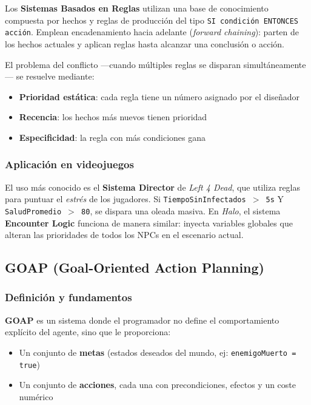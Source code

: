 \documentclass[12pt,letterpaper]{article}
\begin{document}
Los \textbf{Sistemas Basados en Reglas} utilizan una base de conocimiento compuesta por hechos y reglas de producción del tipo \texttt{SI condición ENTONCES acción}. Emplean encadenamiento hacia adelante (\textit{forward chaining}): parten de los hechos actuales y aplican reglas hasta alcanzar una conclusión o acción.

El problema del conflicto —cuando múltiples reglas se disparan simultáneamente— se resuelve mediante:

\begin{itemize}[nosep]
  \item \textbf{Prioridad estática}: cada regla tiene un número asignado por el diseñador
  \item \textbf{Recencia}: los hechos más nuevos tienen prioridad
  \item \textbf{Especificidad}: la regla con más condiciones gana
\end{itemize}

\subsubsection{Aplicación en videojuegos}

El uso más conocido es el \textbf{Sistema Director} de \textit{Left 4 Dead}, que utiliza reglas para puntuar el \textit{estrés} de los jugadores. Si \texttt{TiempoSinInfectados $>$ 5s} Y \texttt{SaludPromedio $>$ 80}, se dispara una oleada masiva. En \textit{Halo}, el sistema \textbf{Encounter Logic} funciona de manera similar: inyecta variables globales que alteran las prioridades de todos los NPCs en el escenario actual.

\subsection{GOAP (Goal-Oriented Action Planning)}

\subsubsection{Definición y fundamentos}

\textbf{GOAP} es un sistema donde el programador no define el comportamiento explícito del agente, sino que le proporciona:

\begin{itemize}[nosep]
  \item Un conjunto de \textbf{metas} (estados deseados del mundo, ej: \texttt{enemigoMuerto = true})
  \item Un conjunto de \textbf{acciones}, cada una con precondiciones, efectos y un coste numérico
\end{itemize}
\end{document}
